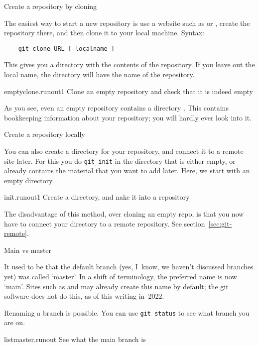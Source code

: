  {Create a repository by cloning}

The easiest way to start a new repository is use a website such as
 or ,
create the repository there, and then clone it to your local machine.
Syntax:
\begin{lstlisting}
    git clone URL [ localname ]
\end{lstlisting}
This gives you a directory with the contents of the repository.
If you leave out the local name, the directory will have the name
of the repository.

\begin{gitstep}{emptyclone.runout1}
  Clone an empty repository and check that it is indeed empty
\end{gitstep}

As you see, even an empty repository contains a directory .
This contains bookkeeping information about your repository;
you will hardly ever look into it.

\newpage
{} {Create a repository locally}

You can also create a directory for your repository,
  and connect it to a remote site later.
  For this you do \lstinline{git init}
  in the directory that is either empty,
  or already contains the material that you want to add later.
  Here, we start with an empty directory.

\begin{gitstep}{init.runout1}
  Create a directory, and nake it into a repository
\end{gitstep}

The disadvantage of this method,
over cloning an empty repo,
is that you now have to connect your directory to a remote repository.
See section~\ref{sec:git-remote}.

\newpage
{} {Main vs master}

It used to be that the default branch
(yes, I~know, we haven't discussed branches yet)
was called `master'.
In a shift of terminology, the preferred name is now `main'.
Sites such as  and 
may already create this name by default;
the git software does not do this, as of this writing in~2022.

Renaming a branch is possible.
You can use \lstinline{git status} to see what branch you are on.

\begin{gitstep}{listmaster.runout}
  See what the main branch is
\end{gitstep}

